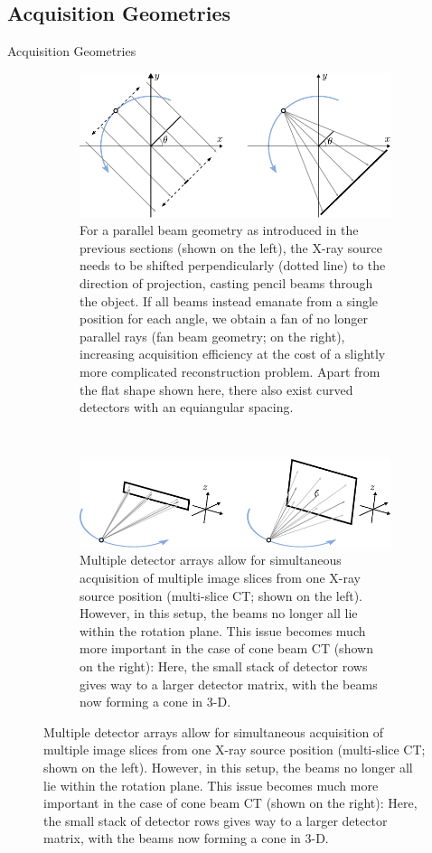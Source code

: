\subsection{Acquisition Geometries}
\label{sub:ct_geom}

\begin{frame}[c,allowframebreaks]{Acquisition Geometries}

	\begin{figure}[tbp]
		\centering
		\begin{subfigure}[t]{0.9\linewidth}
			\centering{}
			\includegraphics[height=0.6\textheight]{images/geom_1}
			\caption{\footnotesize For a parallel beam geometry as introduced in the previous sections (shown on the left), the X-ray source needs to be shifted perpendicularly (dotted line) to the direction of projection, casting pencil beams through the object. If all beams instead emanate from a single position for each angle, we obtain a fan of no longer parallel rays (fan beam geometry; on the right), increasing acquisition efficiency at the cost of a slightly more complicated reconstruction problem. Apart from the flat shape shown here, there also exist curved detectors with an equiangular spacing.}
			\label{fig:ct_geom_1.1}
		\end{subfigure}\\[1cm]
		\begin{subfigure}[t]{0.9\linewidth}
			\centering{}
			\includegraphics[height=0.5\textheight]{images/geom_2}
			\caption{\footnotesize Multiple detector arrays allow for simultaneous acquisition of multiple image slices from one X-ray source position (multi-slice CT; shown on the left). However, in this setup, the beams no longer all lie within the rotation plane. This issue becomes much more important in the case of cone beam CT (shown on the right): Here, the small stack of detector rows gives way to a larger detector matrix, with the beams now forming a cone in 3-D.}
			\label{fig:ct_geom_1.2}
		\end{subfigure}
		\label{fig:ct_geom_1}
	\end{figure}


\end{frame}
